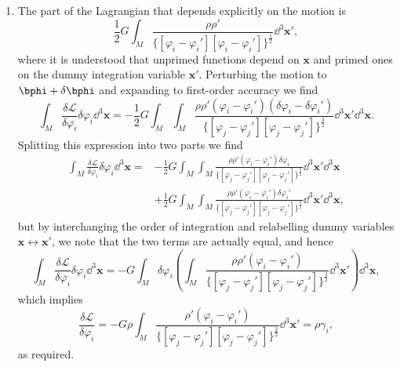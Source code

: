 \documentclass[a4paper,10pt]{paper}
\begin{document}
\begin{enumerate}
\item The part of the Lagrangian that depends explicitly on the motion is
\begin{equation*}
    \frac{1}{2}G\int_{M}\frac{\rho\rho'}{\{[\varphi_{i}-\varphi_{i}'][ \varphi_{i}-\varphi_{i}']\}^{\frac{1}{2}}}\dd^{3}\mathbf{x}',
\end{equation*}
where it is understood that unprimed functions depend on $\mathbf{x}$ and primed ones on the dummy integration variable $\mathbf{x}'$. Perturbing the motion to $\bphi+\delta\bphi$ and expanding to first-order accuracy we find
\begin{equation*}
    \int_{M}\frac{\delta\mathcal{L}}{\delta\varphi_{i}}\delta\varphi_{i}\dd^{3}\mathbf{x}=-\frac{1}{2}G\int_{M}\int_{M}\frac{\rho\rho'(\varphi_{i}-\varphi_{i}')(\delta\varphi_{i}-\delta\varphi_{i}')}{\{[\varphi_{j}-\varphi_{j}'][ \varphi_{j}-\varphi_{j}']\}^{\frac{3}{2}}}\dd^{3}\mathbf{x}'\dd^{3}\mathbf{x}.
\end{equation*}
Splitting this expression into two parts we find
\begin{align*}
    \int_{M}\frac{\delta\mathcal{L}}{\delta\varphi_{i}}\delta\varphi_{i}\dd^{3}\mathbf{x} = &-\frac{1}{2}G\int_{M}\int_{M}\frac{\rho\rho'(\varphi_{i}-\varphi_{i}')\delta\varphi_{i}}{\{[\varphi_{j}-\varphi_{j}'][ \varphi_{j}-\varphi_{j}']\}^{\frac{3}{2}}}\dd^{3}\mathbf{x}'\dd^{3}\mathbf{x} \\
    &+\frac{1}{2}G\int_{M}\int_{M}\frac{\rho\rho'(\varphi_{i}-\varphi_{i}')\delta\varphi_{i}'}{\{[\varphi_{j}-\varphi_{j}'][ \varphi_{j}-\varphi_{j}']\}^{\frac{3}{2}}}\dd^{3}\mathbf{x}'\dd^{3}\mathbf{x},
\end{align*}
but by interchanging the order of integration and relabelling dummy variables $\mathbf{x} \leftrightarrow \mathbf{x}'$, we note that the two terms are actually equal, and hence
\begin{equation*}
    \int_{M}\frac{\delta\mathcal{L}}{\delta\varphi_{i}}\delta\varphi_{i}\dd^{3}\mathbf{x}=-G\int_{M}\delta\varphi_{i} \left( \int_{M}\frac{\rho\rho'(\varphi_{i}-\varphi_{i}')}{\{[\varphi_{j}-\varphi_{j}'][ \varphi_{j}-\varphi_{j}']\}^{\frac{3}{2}}}\dd^{3}\mathbf{x}' \right) \dd^{3}\mathbf{x},
\end{equation*}
which implies
\begin{equation*}
    \frac{\delta\mathcal{L}}{\delta\varphi_{i}}=-G\rho\int_{M}\frac{\rho'(\varphi_{i}-\varphi_{i}')}{\{[\varphi_{j}-\varphi_{j}'][ \varphi_{j}-\varphi_{j}']\}^{\frac{3}{2}}}\dd^{3}\mathbf{x}'=\rho\gamma_{i},
\end{equation*}
as required.


\end{enumerate}
\end{document}
